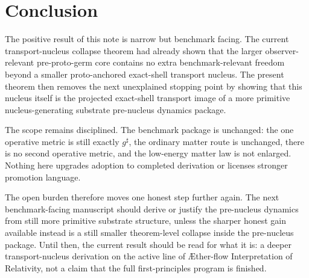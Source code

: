 \documentclass[11pt]{article}
\newcommand{\Aflow}{\AE{}ther-flow}
\newcommand{\TheoryName}{\Aflow{} Interpretation of Relativity}
\newcommand{\CompletedMetric}{g^{\sharp}}
\begin{document}
\section{Conclusion}

The positive result of this note is narrow but benchmark facing. The current transport-nucleus collapse theorem had already shown that the larger observer-relevant pre-proto-germ core contains no extra benchmark-relevant freedom beyond a smaller proto-anchored exact-shell transport nucleus. The present theorem then removes the next unexplained stopping point by showing that this nucleus itself is the projected exact-shell transport image of a more primitive nucleus-generating substrate pre-nucleus dynamics package.

The scope remains disciplined. The benchmark package is unchanged: the one operative metric is still exactly \(\CompletedMetric\), the ordinary matter route is unchanged, there is no second operative metric, and the low-energy matter law is not enlarged. Nothing here upgrades adoption to completed derivation or licenses stronger promotion language.

The open burden therefore moves one honest step further again. The next benchmark-facing manuscript should derive or justify the pre-nucleus dynamics from still more primitive substrate structure, unless the sharper honest gain available instead is a still smaller theorem-level collapse inside the pre-nucleus package. Until then, the current result should be read for what it is: a deeper transport-nucleus derivation on the active line of \TheoryName{}, not a claim that the full first-principles program is finished.
\end{document}
